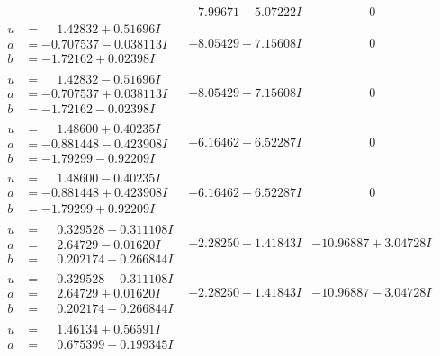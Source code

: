 \documentclass[1p]{elsarticle_modified}
\theoremstyle{definition}
\begin{document}
$$\begin{array}{c|c|c}
 & -7.99671 - 5.07222 I & \phantom{-0.000000 } 0 \\ \hline\begin{aligned}
u &= \phantom{-}1.42832 + 0.51696 I \\
a &= -0.707537 - 0.038113 I \\
b &= -1.72162 + 0.02398 I\end{aligned}
 & -8.05429 - 7.15608 I & \phantom{-0.000000 } 0 \\ \hline\begin{aligned}
u &= \phantom{-}1.42832 - 0.51696 I \\
a &= -0.707537 + 0.038113 I \\
b &= -1.72162 - 0.02398 I\end{aligned}
 & -8.05429 + 7.15608 I & \phantom{-0.000000 } 0 \\ \hline\begin{aligned}
u &= \phantom{-}1.48600 + 0.40235 I \\
a &= -0.881448 - 0.423908 I \\
b &= -1.79299 - 0.92209 I\end{aligned}
 & -6.16462 - 6.52287 I & \phantom{-0.000000 } 0 \\ \hline\begin{aligned}
u &= \phantom{-}1.48600 - 0.40235 I \\
a &= -0.881448 + 0.423908 I \\
b &= -1.79299 + 0.92209 I\end{aligned}
 & -6.16462 + 6.52287 I & \phantom{-0.000000 } 0 \\ \hline\begin{aligned}
u &= \phantom{-}0.329528 + 0.311108 I \\
a &= \phantom{-}2.64729 - 0.01620 I \\
b &= \phantom{-}0.202174 - 0.266844 I\end{aligned}
 & -2.28250 - 1.41843 I & -10.96887 + 3.04728 I \\ \hline\begin{aligned}
u &= \phantom{-}0.329528 - 0.311108 I \\
a &= \phantom{-}2.64729 + 0.01620 I \\
b &= \phantom{-}0.202174 + 0.266844 I\end{aligned}
 & -2.28250 + 1.41843 I & -10.96887 - 3.04728 I \\ \hline\begin{aligned}
u &= \phantom{-}1.46134 + 0.56591 I \\
a &= \phantom{-}0.675399 - 0.199345 I \\

\end{aligned}
\end{array}$$
\end{document}
